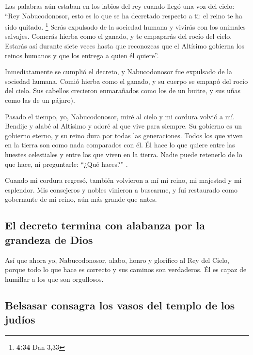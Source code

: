  Las palabras aún estaban en los labios del rey cuando
llegó una voz del cielo: ``Rey Nabucodonosor, esto es lo que se ha
decretado respecto a ti: el reino te ha sido quitado. \footnote{\textbf{4:34}
  Dan 3,33}  Serás expulsado de la sociedad humana y
vivirás con los animales salvajes. Comerás hierba como el ganado, y te
empaparás del rocío del cielo. Estarás así durante siete veces hasta que
reconozcas que el Altísimo gobierna los reinos humanos y que los entrega
a quien él quiere''.

 Inmediatamente se cumplió el decreto, y Nabucodonosor
fue expulsado de la sociedad humana. Comió hierba como el ganado, y su
cuerpo se empapó del rocío del cielo. Sus cabellos crecieron enmarañados
como los de un buitre, y sus uñas como las de un pájaro).

 Pasado el tiempo, yo, Nabucodonosor, miré al cielo y mi
cordura volvió a mí. Bendije y alabé al Altísimo y adoré al que vive
para siempre. Su gobierno es un gobierno eterno, y su reino dura por
todas las generaciones.  Todos los que viven en la tierra
son como nada comparados con él. Él hace lo que quiere entre las huestes
celestiales y entre los que viven en la tierra. Nadie puede retenerlo de
lo que hace, ni preguntarle: ``¿Qué haces?'' .

 Cuando mi cordura regresó, también volvieron a mí mi
reino, mi majestad y mi esplendor. Mis consejeros y nobles vinieron a
buscarme, y fui restaurado como gobernante de mi reino, aún más grande
que antes.

\hypertarget{el-decreto-termina-con-alabanza-por-la-grandeza-de-dios}{%
\subsection{El decreto termina con alabanza por la grandeza de
Dios}\label{el-decreto-termina-con-alabanza-por-la-grandeza-de-dios}}

 Así que ahora yo, Nabucodonosor, alabo, honro y
glorifico al Rey del Cielo, porque todo lo que hace es correcto y sus
caminos son verdaderos. Él es capaz de humillar a los que son
orgullosos.

\hypertarget{belsasar-consagra-los-vasos-del-templo-de-los-juduxedos}{%
\subsection{Belsasar consagra los vasos del templo de los
judíos}\label{belsasar-consagra-los-vasos-del-templo-de-los-juduxedos}}

